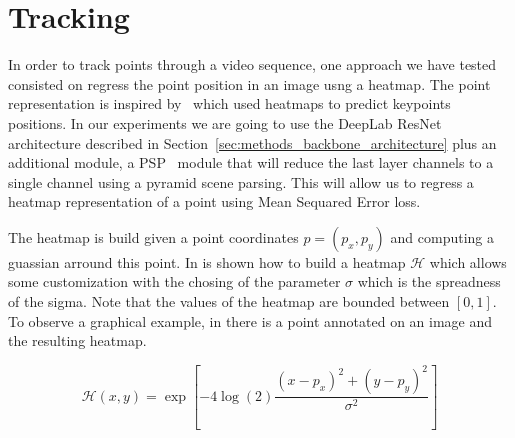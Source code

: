 \section{Tracking}
\label{sec:methods_tracking}

In order to track points through a video sequence, one approach we have tested consisted on regress the point position in an image usng a heatmap.
The point representation is inspired by~\cite{nam2016learning} which used heatmaps to predict keypoints positions.
In our experiments we are going to use the DeepLab ResNet architecture described in Section~\ref{sec:methods_backbone_architecture} plus an additional module, a PSP~\cite{zhao2017pyramid} module that will reduce the last layer channels to a single channel using a pyramid scene parsing.
This will allow us to regress a heatmap representation of a point using Mean Sequared Error loss.

The heatmap is build given a point coordinates $p = (p_x, p_y)$ and computing a guassian arround this point.
In  is shown how to build a heatmap $\mathcal{H}$ which allows some customization with the chosing of the parameter $\sigma$ which is the spreadness of the sigma.
Note that the values of the heatmap are bounded between $[0, 1]$.
To observe a graphical example, in  there is a point annotated on an image and the resulting heatmap.

\begin{equation}
  \mathcal{H}(x, y) = \exp \left[ -4 \log(2) \frac{ (x - p_x)^2 + (y - p_y)^2 }{ \sigma^2 } \right]
  \label{eq:heatmap}
\end{equation}

